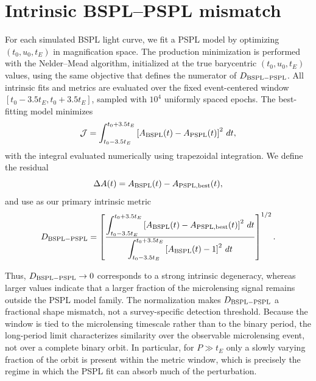\documentclass{article}
\begin{document}
\section{Intrinsic BSPL--PSPL mismatch}
\label{sec:degeneracy_metrics}

For each simulated BSPL light curve, we fit a PSPL model by optimizing
$(t_0,u_0,t_E)$ in magnification space. The production minimization is
performed with the Nelder--Mead algorithm, initialized at the true
barycentric $(t_0,u_0,t_E)$ values, using the same objective that defines
the numerator of $D_{\rm BSPL-PSPL}$. All intrinsic fits and metrics are
evaluated over the fixed event-centered window
$[t_0-3.5t_E,t_0+3.5t_E]$, sampled with $10^4$ uniformly spaced epochs.
The best-fitting model minimizes
\begin{equation}
\mathcal{J}
=
\int_{t_0-3.5t_E}^{t_0+3.5t_E}
\left[
A_{\rm BSPL}(t)-A_{\rm PSPL}(t)
\right]^2
\,dt,
\end{equation}
with the integral evaluated numerically using trapezoidal integration.
We define the residual
\begin{equation}
\Delta A(t)
=
A_{\rm BSPL}(t)-A_{\rm PSPL,best}(t),
\end{equation}
and use as our primary intrinsic metric
\begin{equation}
D_{\rm BSPL-PSPL}
=
\left[
\frac{
\displaystyle
\int_{t_0-3.5t_E}^{t_0+3.5t_E}
\left[
A_{\rm BSPL}(t)-A_{\rm PSPL,best}(t)
\right]^2
\,dt
}{
\displaystyle
\int_{t_0-3.5t_E}^{t_0+3.5t_E}
\left[
A_{\rm BSPL}(t)-1
\right]^2
\,dt
}
\right]^{1/2}.
\label{eq:D_metric}
\end{equation}

Thus, $D_{\rm BSPL-PSPL}\rightarrow0$ corresponds to a strong intrinsic
degeneracy, whereas larger values indicate that a larger fraction of
the microlensing signal remains outside the PSPL model family. The
normalization makes $D_{\rm BSPL-PSPL}$ a fractional shape mismatch,
not a survey-specific detection threshold. Because the window is tied
to the microlensing timescale rather than to the binary period, the
long-period limit characterizes similarity over the observable
microlensing event, not over a complete binary orbit. In particular,
for $P\gg t_E$ only a slowly varying fraction of the orbit is present
within the metric window, which is precisely the regime in which the
PSPL fit can absorb much of the perturbation.
\end{document}
